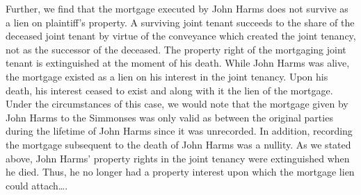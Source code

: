 Further, we find that the mortgage executed by John Harms does not survive as a
lien on plaintiff's property. A surviving joint tenant succeeds to the share of
the deceased joint tenant by virtue of the conveyance which created the joint
tenancy, not as the successor of the deceased. The property right of the
mortgaging joint tenant is extinguished at the moment of his death. While John
Harms was alive, the mortgage existed as a lien on his interest in the joint
tenancy. Upon his death, his interest ceased to exist and along with it the
lien of the mortgage. Under the circumstances of this case, we would note that
the mortgage given by John Harms to the Simmonses was only valid as between the
original parties during the lifetime of John Harms since it was unrecorded. In
addition, recording the mortgage subsequent to the death of John Harms was a
nullity. As we stated above, John Harms' property rights in the joint tenancy
were extinguished when he died. Thus, he no longer had a property interest upon
which the mortgage lien could attach\dots.

